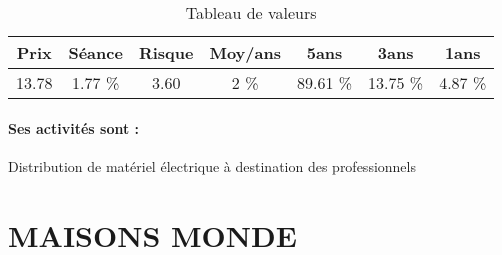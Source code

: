 \documentclass[11pt,a4paper]{report}%
\begin{document}
\begin{table}[H]
  \centering
    \begin{tabular}{|c|c|c|c|c|c|c|}
    \hline
    Prix & Séance & Risque  & Moy/ans & 5ans & 3ans & 1ans \\
    \hline
    13.78 &    1.77 \%    & 3.60 & 2 \% & 89.61 \% & 13.75 \% & 4.87 \% \\
    \hline
    \end{tabular}%
        \label{tab:table_REXEL}%
      \caption{Tableau de valeurs}
\end{table}%

\paragraph{Ses activités sont : } Distribution de matériel électrique à destination des professionnels  
    
    \newpage

\section{MAISONS MONDE}
\end{document}
